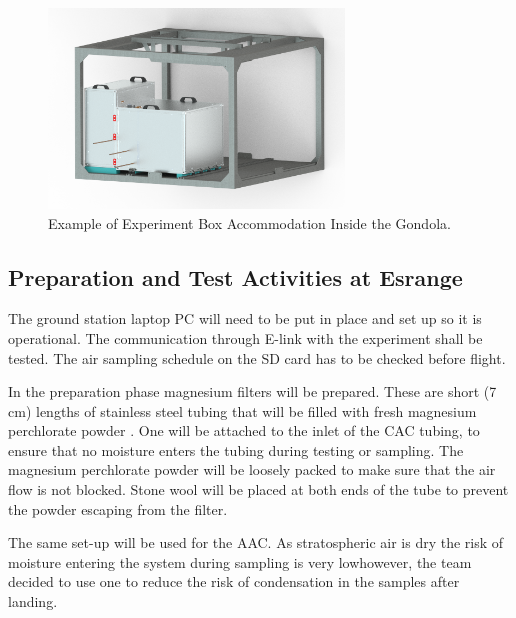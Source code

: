 \documentclass[a4paper,12pt,oneside]{article} %
\providecommand{\DIFaddtex}[1]{{\protect\color{blue}\uwave{#1}}} %
\providecommand{\DIFaddbegin}{} %
\providecommand{\DIFaddend}{} %
\providecommand{\DIFaddbeginFL}{} %
\providecommand{\DIFaddendFL}{} %
\providecommand{\DIFdelbeginFL}{} %
\providecommand{\DIFdelendFL}{} %
\providecommand{\DIFadd}[1]{\texorpdfstring{\DIFaddtex{#1}}{#1}} %
\newcommand{\DIFscaledelfig}{0.5}
\newlength{\DIFdelgraphicswidth} %
\newlength{\DIFdelgraphicsheight} %
\newcommand{\DIFaddincludegraphics}[2][]{{\color{blue}\fbox{\DIFOincludegraphics[#1]{#2}}}} %
\newcommand{\DIFdelincludegraphics}[2][]{%
\sbox{\DIFdelgraphicsbox}{\DIFOincludegraphics[#1]{#2}}%
\settoboxwidth{\DIFdelgraphicswidth}{\DIFdelgraphicsbox} %
\settoboxtotalheight{\DIFdelgraphicsheight}{\DIFdelgraphicsbox} %
\scalebox{\DIFscaledelfig}{%
\parbox[b]{\DIFdelgraphicswidth}{\usebox{\DIFdelgraphicsbox}\\[-\baselineskip] \rule{\DIFdelgraphicswidth}{0em}}\llap{\resizebox{\DIFdelgraphicswidth}{\DIFdelgraphicsheight}{%
\setlength{\unitlength}{\DIFdelgraphicswidth}%
\begin{picture}(1,1)%
\thicklines\linethickness{2pt} %
{\color[rgb]{1,0,0}\put(0,0){\framebox(1,1){}}}%
{\color[rgb]{1,0,0}\put(0,0){\line( 1,1){1}}}%
{\color[rgb]{1,0,0}\put(0,1){\line(1,-1){1}}}%
\end{picture}%
}\hspace*{3pt}}} %
} %
\DeclareRobustCommand{\DIFaddbegin}{\DIFOaddbegin \let\includegraphics\DIFaddincludegraphics} %
\DeclareRobustCommand{\DIFaddend}{\DIFOaddend \let\includegraphics\DIFOincludegraphics} %
\DeclareRobustCommand{\DIFaddbeginFL}{\DIFOaddbeginFL \let\includegraphics\DIFaddincludegraphics} %
\DeclareRobustCommand{\DIFaddendFL}{\DIFOaddendFL \let\includegraphics\DIFOincludegraphics} %
\DeclareRobustCommand{\DIFdelbeginFL}{\DIFOdelbeginFL \let\includegraphics\DIFdelincludegraphics} %
\DeclareRobustCommand{\DIFdelendFL}{\DIFOaddendFL \let\includegraphics\DIFOincludegraphics} %
\begin{document}
\begin{figure}[H]
    \centering
    \DIFdelbeginFL %
\DIFdelendFL \DIFaddbeginFL \includegraphics[width=0.7\textwidth]{6-launch-campaign-preparation/img/Figure_49_Gondola.png}
    \DIFaddendFL \caption{Example of Experiment Box Accommodation Inside the Gondola.}
    \label{goldola_accommodation}
\end{figure}
\pagebreak
\subsection{Preparation and Test Activities at Esrange}\label{prep_for_Esrange}
The ground station laptop PC will need to be put in place and set up so it is operational. The communication through E-link with the experiment shall be tested. The air sampling schedule on the SD card has to be checked before flight.

In the preparation phase magnesium filters will be prepared. These are short (7 cm) lengths of stainless steel tubing that will be filled with \DIFaddbegin \DIFadd{2 mg of }\DIFaddend fresh magnesium perchlorate powder \cite{Karion}. One will be attached to the inlet of the CAC tubing, to ensure that no moisture enters the tubing during testing or sampling. The magnesium perchlorate powder will be loosely packed to make sure that the air flow is not blocked. Stone wool will be placed at both ends of the tube to prevent the powder escaping from the filter.

The same set-up will be used for the AAC. As stratospheric air is dry the risk of moisture entering the system during sampling is very low\DIFaddbegin \DIFadd{, }\DIFaddend however, the team decided to use one to reduce the risk of condensation in the samples after landing. 
\end{document}
